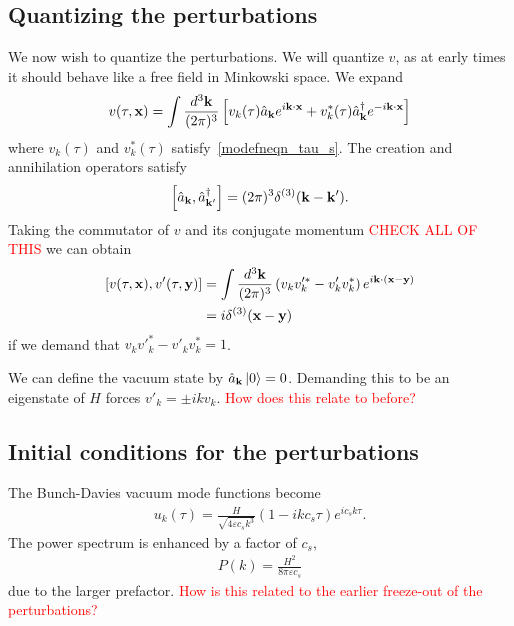     \subsection{Quantizing the perturbations}
    We now wish to quantize the perturbations. We will quantize $v$,
    as at early times it should behave like a free field in Minkowski space.
    We expand
    \begin{align}
        v(\tau,\mathbf{x}) = \int\frac{d^3\mathbf{k}}{(2\pi)^3}\left[
            v_k(\tau)\hat{a}_{\mathbf{k}} e^{i\mathbf{k}\cdot\mathbf{x}}+
            v^*_k(\tau)\hat{a}^{\dagger}_{\mathbf{k}} e^{-i\mathbf{k}\cdot\mathbf{x}}
        \right]
    \end{align}
    where $v_k(\tau)$ and $v^*_k(\tau)$ satisfy~\eqref{modefneqn_tau_s}.
    The creation and annihilation operators satisfy
    \begin{align}
        \left[\hat{a}_{\mathbf{k}},\hat{a}^{\dagger}_{\mathbf{k}'}\right] = (2\pi)^3\delta^{(3)}(\mathbf{k}-\mathbf{k}').
    \end{align}
    Taking the commutator of $v$ and its conjugate momentum
    \textcolor{red}{CHECK ALL OF THIS}
    we can obtain
    \begin{align}
        \left[v(\tau,\mathbf{x}),v'(\tau,\mathbf{y})\right] &=
        \int \frac{d^3 \mathbf{k}}{(2\pi)^3}\left(v_kv'^*_k-v'_kv^*_k\right)e^{i\mathbf{k}\cdot(\mathbf{x}-\mathbf{y})}\\
        &= i \delta^{(3)}(\mathbf{x}-\mathbf{y})
    \end{align}
    if we demand that $v_kv'^*_k-v'_kv^*_k=1$.


    We can define the vacuum state by $\hat{a}_{\mathbf{k}}\left| 0\right>=0$.
    Demanding this to be an eigenstate of $H$ forces $v'_k=\pm ikv_k$.
    \textcolor{red}{How does this relate to before?}

    \subsection{Initial conditions for the perturbations}
    The Bunch-Davies vacuum mode functions become
    \begin{align}
        u_k(\tau) = \frac{H}{\sqrt{4\varepsilon c_s k^3}}\left(1-ikc_s\tau\right)e^{ic_s k\tau}.
    \end{align}
    The power spectrum is enhanced by a factor of $c_s$,
    \begin{align}
        P(k) = \frac{H^2}{8\pi\varepsilon c_s}
    \end{align}
    due to the larger prefactor.
    \textcolor{red}{How is this related to the earlier freeze-out of the perturbations?}

